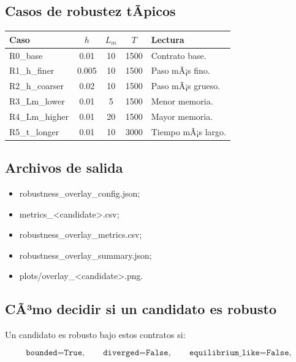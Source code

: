 \documentclass[11pt]{article}
\DeclareRobustCommand{\codepath}[1]{\begingroup\Urlmuskip=0mu plus 2mu\path{#1}\endgroup}
\def\codepath#1{#1}%
\begin{document}
\subsection{Casos de robustez tÃ­picos}

\begin{center}
\small
\begin{tabular}{@{}L{0.22\textwidth}cccL{0.26\textwidth}@{}}
\toprule
Caso & \(h\) & \(L_m\) & \(T\) & Lectura\\
\midrule
\codepath{R0_base} & 0.01 & 10 & 1500 & Contrato base.\\
\codepath{R1_h_finer} & 0.005 & 10 & 1500 & Paso mÃ¡s fino.\\
\codepath{R2_h_coarser} & 0.02 & 10 & 1500 & Paso mÃ¡s grueso.\\
\codepath{R3_Lm_lower} & 0.01 & 5 & 1500 & Menor memoria.\\
\codepath{R4_Lm_higher} & 0.01 & 20 & 1500 & Mayor memoria.\\
\codepath{R5_t_longer} & 0.01 & 10 & 3000 & Tiempo mÃ¡s largo.\\
\bottomrule
\end{tabular}
\end{center}

\subsection{Archivos de salida}

\begin{itemize}
\item \codepath{robustness_overlay_config.json};
\item \codepath{metrics_<candidate>.csv};
\item \codepath{robustness_overlay_metrics.csv};
\item \codepath{robustness_overlay_summary.json};
\item \codepath{plots/overlay_<candidate>.png}.
\end{itemize}

\subsection{CÃ³mo decidir si un candidato es robusto}

Un candidato es robusto bajo estos contratos si:

\begin{equation}
\texttt{bounded=True},
\qquad
\texttt{diverged=False},
\qquad
\texttt{equilibrium\_like=False},
\end{equation}
\end{document}
